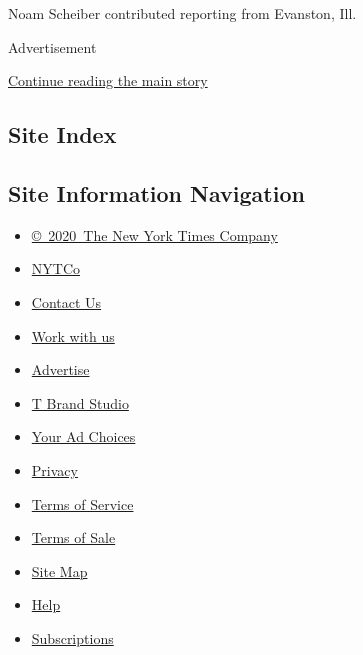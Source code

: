 Noam Scheiber contributed reporting from Evanston, Ill.

Advertisement

\protect\hyperlink{after-bottom}{Continue reading the main story}

\hypertarget{site-index}{%
\subsection{Site Index}\label{site-index}}

\hypertarget{site-information-navigation}{%
\subsection{Site Information
Navigation}\label{site-information-navigation}}

\begin{itemize}
\tightlist
\item
  \href{https://help.nytimes3xbfgragh.onion/hc/en-us/articles/115014792127-Copyright-notice}{©~2020~The
  New York Times Company}
\end{itemize}

\begin{itemize}
\tightlist
\item
  \href{https://www.nytco.com/}{NYTCo}
\item
  \href{https://help.nytimes3xbfgragh.onion/hc/en-us/articles/115015385887-Contact-Us}{Contact
  Us}
\item
  \href{https://www.nytco.com/careers/}{Work with us}
\item
  \href{https://nytmediakit.com/}{Advertise}
\item
  \href{http://www.tbrandstudio.com/}{T Brand Studio}
\item
  \href{https://www.nytimes3xbfgragh.onion/privacy/cookie-policy\#how-do-i-manage-trackers}{Your
  Ad Choices}
\item
  \href{https://www.nytimes3xbfgragh.onion/privacy}{Privacy}
\item
  \href{https://help.nytimes3xbfgragh.onion/hc/en-us/articles/115014893428-Terms-of-service}{Terms
  of Service}
\item
  \href{https://help.nytimes3xbfgragh.onion/hc/en-us/articles/115014893968-Terms-of-sale}{Terms
  of Sale}
\item
  \href{https://spiderbites.nytimes3xbfgragh.onion}{Site Map}
\item
  \href{https://help.nytimes3xbfgragh.onion/hc/en-us}{Help}
\item
  \href{https://www.nytimes3xbfgragh.onion/subscription?campaignId=37WXW}{Subscriptions}
\end{itemize}
